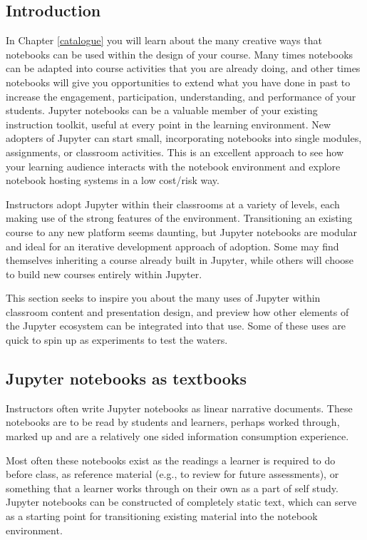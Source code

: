 \documentclass[]{book}
\begin{document}
\subsection{Introduction}\label{introduction}

In Chapter \ref{catalogue} you will learn about the many creative ways
that notebooks can be used within the design of your course. Many times
notebooks can be adapted into course activities that you are already
doing, and other times notebooks will give you opportunities to extend
what you have done in past to increase the engagement, participation,
understanding, and performance of your students. Jupyter notebooks can
be a valuable member of your existing instruction toolkit, useful at
every point in the learning environment. New adopters of Jupyter can
start small, incorporating notebooks into single modules, assignments,
or classroom activities. This is an excellent approach to see how your
learning audience interacts with the notebook environment and explore
notebook hosting systems in a low cost/risk way.

Instructors adopt Jupyter within their classrooms at a variety of
levels, each making use of the strong features of the environment.
Transitioning an existing course to any new platform seems daunting, but
Jupyter notebooks are modular and ideal for an iterative development
approach of adoption. Some may find themselves inheriting a course
already built in Jupyter, while others will choose to build new courses
entirely within Jupyter.

This section seeks to inspire you about the many uses of Jupyter within
classroom content and presentation design, and preview how other
elements of the Jupyter ecosystem can be integrated into that use. Some
of these uses are quick to spin up as experiments to test the waters.

\subsection{Jupyter notebooks as
textbooks}\label{jupyter-notebooks-as-textbooks}

Instructors often write Jupyter notebooks as linear narrative documents.
These notebooks are to be read by students and learners, perhaps worked
through, marked up and are a relatively one sided information
consumption experience.

Most often these notebooks exist as the readings a learner is required
to do before class, as reference material (e.g., to review for future
assessments), or something that a learner works through on their own as
a part of self study. Jupyter notebooks can be constructed of completely
static text, which can serve as a starting point for transitioning
existing material into the notebook environment.
\end{document}
